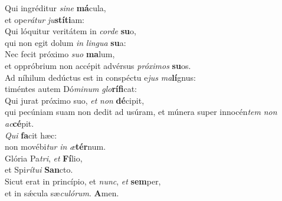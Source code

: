 \evenverse Qui ingréditur \textit{si}\textit{ne} \textbf{má}cula,~\*\\
\evenverse et ope\textit{rá}\textit{tur} \textit{ju}\textbf{stí}\textbf{ti}am:\\
\oddverse Qui lóquitur veritátem in \textit{cor}\textit{de} \textbf{su}o,~\*\\
\oddverse qui non egit dolum \textit{in} \textit{lin}\textit{gua} \textbf{su}a:\\
\evenverse Nec fecit próximo \textit{su}\textit{o} \textbf{ma}lum,~\*\\
\evenverse et oppróbrium non accépit advérsus \textit{pró}\textit{xi}\textit{mos} \textbf{su}os.\\
\oddverse Ad níhilum dedúctus est in conspéctu e\textit{jus} \textit{ma}\textbf{lí}gnus:~\*\\
\oddverse timéntes autem Dó\textit{mi}\textit{num} \textit{glo}\textbf{rí}\textbf{fi}cat:\\
\evenverse Qui jurat próximo suo, \textit{et} \textit{non} \textbf{dé}cipit,~\*\\
\evenverse qui pecúniam suam non dedit ad usúram, et múnera super innocén\textit{tem} \textit{non} \textit{ac}\textbf{cé}pit.\\
\oddverse \textit{Qui} \textbf{fa}cit hæc:~\*\\
\oddverse non movébi\textit{tur} \textit{in} \textit{æ}\textbf{tér}num.\\
\evenverse Glória Pa\textit{tri}, \textit{et} \textbf{Fí}lio,~\*\\
\evenverse et Spi\textit{rí}\textit{tu}\textit{i} \textbf{San}cto.\\
\oddverse Sicut erat in princípio, et \textit{nunc}, \textit{et} \textbf{sem}per,~\*\\
\oddverse et in sǽcula sæ\textit{cu}\textit{ló}\textit{rum}. \textbf{A}men.\\
